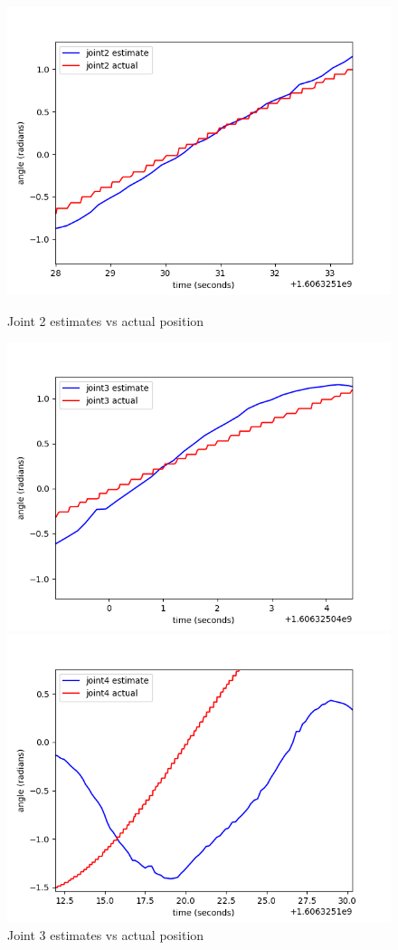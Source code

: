 \documentclass[11pt]{article}
\begin{document}
\begin{figure}[!htb]
    \includegraphics[width=\linewidth]{../figures/joint2.png}
    \caption{Joint 2 estimates vs actual position}
\endminipage\hfill
{}
    \includegraphics[width=\linewidth]{../figures/joint3.png}
    \caption{Joint 3 estimates vs actual position}
\endminipage\hfill
{}
    \includegraphics[width=\linewidth]{../figures/joint4.png}

\end{figure}
\end{document}
